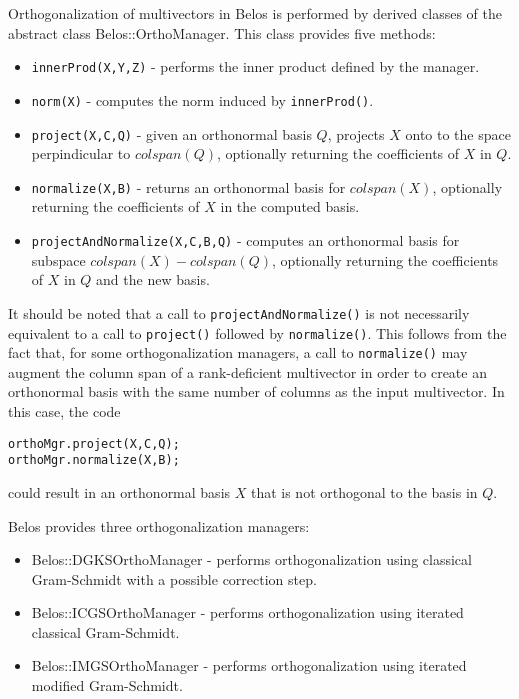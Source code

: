 Orthogonalization of multivectors in Belos is performed by derived classes of
the abstract class Belos::OrthoManager. This class provides five methods:
\begin{itemize}
  \item \verb!innerProd(X,Y,Z)! - performs the inner product defined by the manager.
  \item \verb!norm(X)! - computes the norm induced by \verb!innerProd()!.
  \item \verb!project(X,C,Q)! - given an orthonormal basis $Q$, projects $X$ onto to the space perpindicular to
    $colspan(Q)$, optionally returning the coefficients of $X$ in $Q$.
  \item \verb!normalize(X,B)! - returns an orthonormal basis for $colspan(X)$, optionally
    returning the coefficients of $X$ in the computed basis.
  \item \verb!projectAndNormalize(X,C,B,Q)! - computes an orthonormal basis for subspace
    \newline
    $colspan(X) - colspan(Q)$, optionally returning the coefficients of
    $X$ in $Q$ and the new basis.
\end{itemize}

It should be noted that a call to \verb!projectAndNormalize()! is not necessarily
equivalent to a call to \verb!project()! followed by \verb!normalize()!. This follows from
the fact that, for some orthogonalization managers, a call to \verb!normalize()! may
augment the column span of a rank-deficient multivector in order to create an orthonormal
basis with the same number of columns as the input multivector. In this case, the code
\begin{verbatim}
orthoMgr.project(X,C,Q);
orthoMgr.normalize(X,B);
\end{verbatim}
\noindent could result in an orthonormal basis $X$ that is not orthogonal to the basis in $Q$.

Belos provides three orthogonalization managers:
\begin{itemize}
  \item Belos::DGKSOrthoManager - performs orthogonalization using classical Gram-Schmidt with
    a possible correction step.
  \item Belos::ICGSOrthoManager - performs orthogonalization using iterated classical Gram-Schmidt.
  \item Belos::IMGSOrthoManager - performs orthogonalization using iterated modified Gram-Schmidt.
\end{itemize}

